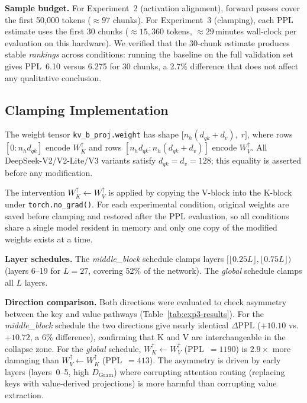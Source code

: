 \medskip\noindent
\textbf{Sample budget.}
For Experiment~2 (activation alignment), forward passes cover the first
50{,}000 tokens (${\approx}97$ chunks).
For Experiment~3 (clamping), each PPL estimate uses the first 30 chunks
(${\approx}15{,}360$ tokens, ${\approx}29$\,minutes wall-clock per evaluation
on this hardware).
We verified that the 30-chunk estimate produces stable \emph{rankings} across
conditions: running the baseline on the full validation set gives PPL~6.10
versus 6.275 for 30 chunks, a 2.7\% difference that does not affect any
qualitative conclusion.

\subsection{Clamping Implementation}
\label{app:clamping}

The weight tensor \texttt{kv\_b\_proj.weight} has shape
$\bigl[n_h(d_{qk} + d_v),\; r\bigr]$,
where rows $[0 : n_h d_{qk}]$ encode $W_K^\uparrow$ and rows
$[n_h d_{qk} : n_h(d_{qk}+d_v)]$ encode $W_V^\uparrow$.
All DeepSeek-V2/V2-Lite/V3 variants satisfy $d_{qk} = d_v = 128$; this
equality is asserted before any modification.

The intervention $W_K^\uparrow \leftarrow W_V^\uparrow$ is applied by copying
the V-block into the K-block under \texttt{torch.no\_grad()}.
For each experimental condition, original weights are saved before clamping and
restored after the PPL evaluation, so all conditions share a single model
resident in memory and only one copy of the modified weights exists at a time.

\medskip\noindent
\textbf{Layer schedules.}
The \emph{middle\_block} schedule clamps layers
$\bigl[\lfloor 0.25L \rfloor, \lfloor 0.75L \rfloor\bigr)$
(layers 6--19 for $L=27$, covering 52\% of the network).
The \emph{global} schedule clamps all $L$ layers.

\medskip\noindent
\textbf{Direction comparison.}
Both directions were evaluated to check asymmetry between the key and value
pathways (Table~\ref{tab:exp3-results}).
For the \emph{middle\_block} schedule the two directions give nearly identical
$\Delta\text{PPL}$ ($+10.10$ vs.\ $+10.72$, a 6\% difference), confirming that
K and V are interchangeable in the collapse zone.
For the \emph{global} schedule, $W_K^\uparrow \leftarrow W_V^\uparrow$
(PPL~$= 1190$) is $2.9\times$ more damaging than
$W_V^\uparrow \leftarrow W_K^\uparrow$ (PPL~$= 413$).
The asymmetry is driven by early layers (layers~0--5, high $D_\text{Gram}$)
where corrupting attention routing (replacing keys with value-derived
projections) is more harmful than corrupting value extraction.
